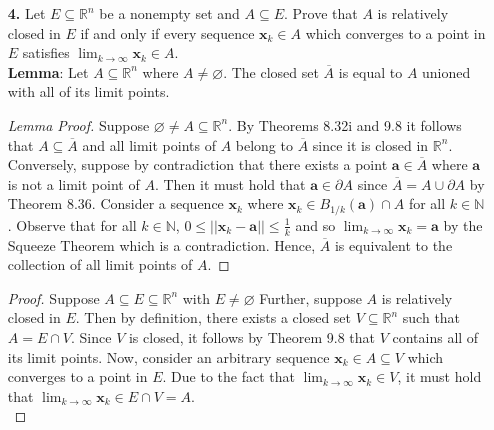 \documentclass[ 12pt ]{article}
\begin{document}
\begin{enumerate}
\begin{proof}
			I claim that both series converge. Observe that it suffices to show that the latter of the two series converges by Remark 6.20. Consider the series $$\sum_{k
			\geq 0} \frac{1}{2^{k-1}} = 2 \sum_{k \geq 0} \frac{1}{2^k} = \frac{2}{1 - \frac{1}{2}} = 4$$ which converges by the Geometric Series. Additionally, notice that
			for all $k \in \mathbb{N}$,
			\begin{align*}
				2^{k - 1} &\leq (k + 1)2^{k - 1} \\
				\frac{1}{(k+1)2^{k-1}} &\leq \frac{1}{2^{k-1}}.
			\end{align*}
			Hence, $\sum_{k \geq 0} \frac{1}{(k+1)2^{k-1}}$ converges by the Comparison Test. Therefore, the interval of convergence of the series $$\sum_{k \geq 0}
			\frac{(x+1)^k}{(k+1)2^k}$$ is $[-3, 1]$.
		\end{proof}


	\item[\textbf{4.}] Let $E \subseteq \mathbb{R}^n$ be a nonempty set and $A \subseteq E$. Prove that $A$ is relatively closed in $E$ if and only if every sequence
		$\textbf{x}_k \in A$ which converges to a point in $E$ satisfies $\lim_{k \to \infty} \textbf{x}_k \in A$. \\

		\textbf{Lemma}: Let $A \subseteq \mathbb{R}^n$ where $A \neq \varnothing$. The closed set $\overline{A}$ is equal to $A$ unioned with all of its limit points.

		\begin{proof}[Lemma Proof]
			Suppose $\varnothing \neq A \subseteq \mathbb{R}^n$. By Theorems 8.32i and 9.8 it follows that $A \subseteq \overline{A}$ and all limit points of $A$ belong to
			$\overline{A}$ since it is closed in $\mathbb{R}^n$. Conversely, suppose by contradiction that there exists a point $\textbf{a} \in \overline{A}$ where
			$\textbf{a}$ is not a limit point of $A$. Then it must hold that $\textbf{a} \in \partial A$ since $\overline{A} = A \cup \partial A$ by Theorem 8.36. Consider
			a sequence $\textbf{x}_k$ where $\textbf{x}_k \in B_{1/k}(\textbf{a}) \cap A$ for all $k \in \mathbb{N}$. Observe that for all $k \in \mathbb{N}$, $0 \leq
			||\textbf{x}_k - \textbf{a}|| \leq \frac{1}{k}$ and so $\lim_{k \to \infty} \textbf{x}_k = \textbf{a}$ by the Squeeze Theorem which is a contradiction. Hence,
			$\overline{A}$ is equivalent to the collection of all limit points of $A$.
		\end{proof}

		\begin{proof}
			Suppose $A \subseteq E \subseteq \mathbb{R}^n$ with $E \neq \varnothing$ Further, suppose $A$ is relatively closed in $E$. Then by definition, there
			exists a closed set $V \subseteq \mathbb{R}^n$ such that $A = E \cap V$. Since $V$ is closed, it follows by Theorem 9.8 that $V$ contains all of its limit points.
			Now, consider an arbitrary sequence $\textbf{x}_k \in A \subseteq V$ which converges to a point in $E$. Due to the fact that $\lim_{k \to \infty} \textbf{x}_k
			\in V$, it must hold that $\lim_{k \to \infty} \textbf{x}_k \in E \cap V = A$. \\


\end{proof}
\end{enumerate}
\end{document}
